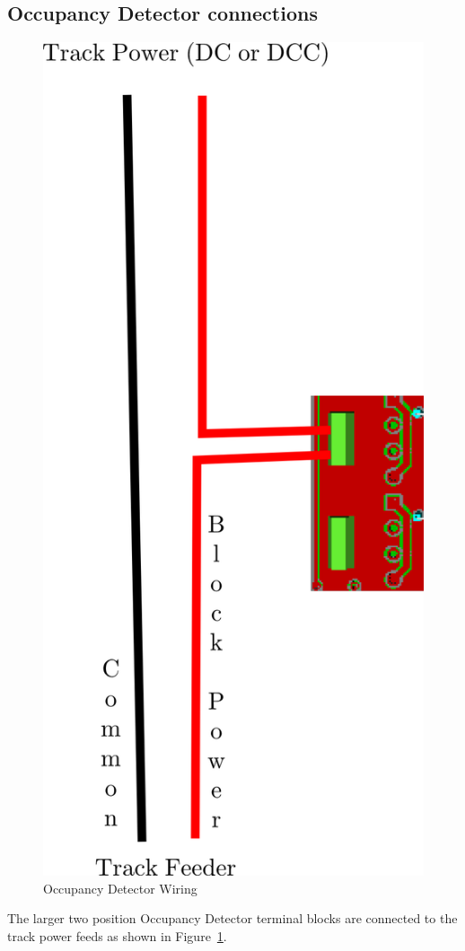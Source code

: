 \clearpage
\subsection{Occupancy Detector connections}

\begin{figure}[hbpt]\begin{centering}%
\includegraphics{ESP32-PWMHalfSidingOccupancyDetectors.png}
\caption{Occupancy Detector Wiring}
\label{fig:ESP32-PWMHalfSidingOccupancyDetectors}
\end{centering}\end{figure}
The larger two position Occupancy Detector terminal blocks are connected to 
the track power feeds as shown in 
Figure~\ref{fig:ESP32-PWMHalfSidingOccupancyDetectors}.

